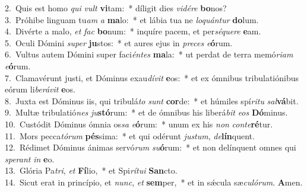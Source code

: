 {2.~}Quis est homo \textit{qui} \textit{vult} \textbf{vi}tam:~* díligit dies \textit{vi}\textit{dé}\textit{re} \textbf{bo}nos?\\
{3.~}Próhibe linguam tu\textit{am} \textit{a} \textbf{ma}lo:~* et lábia tua ne \textit{lo}\textit{quán}\textit{tur} \textbf{do}lum.\\
{4.~}Divérte a malo, \textit{et} \textit{fac} \textbf{bo}num:~* inquíre pacem, et per\textit{sé}\textit{que}\textit{re} \textbf{e}am.\\
{5.~}Oculi Dómini \textit{su}\textit{per} \textbf{ju}stos:~* et aures ejus in \textit{pre}\textit{ces} \textit{e}\textbf{ó}rum.\\
{6.~}Vultus autem Dómini super faci\textit{én}\textit{tes} \textbf{ma}la:~* ut perdat de terra memó\textit{ri}\textit{am} \textit{e}\textbf{ó}rum.\\
{7.~}Clamavérunt justi, et Dóminus exau\textit{dí}\textit{vit} \textbf{e}os:~* et ex ómnibus tribulatiónibus eórum li\textit{be}\textit{rá}\textit{vit} \textbf{e}os.\\
{8.~}Juxta est Dóminus iis, qui tribulá\textit{to} \textit{sunt} \textbf{cor}de:~* et húmiles spí\textit{ri}\textit{tu} \textit{sal}\textbf{vá}bit.\\
{9.~}Multæ tribulatió\textit{nes} \textit{ju}\textbf{stó}rum:~* et de ómnibus his liberá\textit{bit} \textit{e}\textit{os} \textbf{Dó}minus.\\
{10.~}Custódit Dóminus ómnia os\textit{sa} \textit{e}\textbf{ó}rum:~* unum ex his \textit{non} \textit{con}\textit{te}\textbf{ré}tur.\\
{11.~}Mors pecca\textit{tó}\textit{rum} \textbf{pés}sima:~* et qui odérunt \textit{ju}\textit{stum}, \textit{de}\textbf{lín}quent.\\
{12.~}Rédimet Dóminus ánimas servó\textit{rum} \textit{su}\textbf{ó}rum:~* et non delínquent omnes qui \textit{spe}\textit{rant} \textit{in} \textbf{e}o.\\
{13.~}Glória Pa\textit{tri}, \textit{et} \textbf{Fí}lio,~* et Spi\textit{rí}\textit{tu}\textit{i} \textbf{San}cto.\\
{14.~}Sicut erat in princípio, et \textit{nunc}, \textit{et} \textbf{sem}per,~* et in sǽcula sæ\textit{cu}\textit{ló}\textit{rum}. \textbf{A}men.\\
